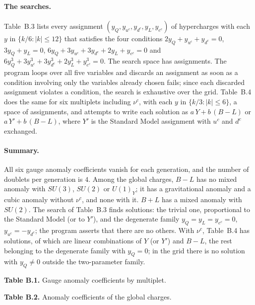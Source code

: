 \paragraph{The searches.} Table~B.3 lists every assignment $(y_Q, y_{u^c}, y_{d^c}, y_L, y_{e^c})$ of hypercharges with each $y$ in $\{k/6 : |k| \leq 12\}$ that satisfies the four conditions $2y_Q + y_{u^c} + y_{d^c} = 0$, $3y_Q + y_L = 0$, $6y_Q + 3y_{u^c} + 3y_{d^c} + 2y_L + y_{e^c} = 0$ and $6y_Q^3 + 3y_{u^c}^3 + 3y_{d^c}^3 + 2y_L^3 + y_{e^c}^3 = 0$. The search space has \vvNBthreeSpace{} assignments. The program loops over all five variables and discards an assignment as soon as a condition involving only the variables already chosen fails; since each discarded assignment violates a condition, the search is exhaustive over the grid. Table~B.4 does the same for six multiplets including $\nu^c$, with each $y$ in $\{k/3 : |k| \leq 6\}$, a space of \vvNBfourSpace{} assignments, and attempts to write each solution as $a\,Y + b\,(B-L)$ or $a\,Y' + b\,(B-L)$, where $Y'$ is the Standard Model assignment with $u^c$ and $d^c$ exchanged.

\paragraph{Summary.} All six gauge anomaly coefficients vanish for each generation, and the number of doublets per generation is $4$. Among the global charges, $B-L$ has no mixed anomaly with $SU(3)$, $SU(2)$ or $U(1)_Y$; it has a gravitational anomaly and a cubic anomaly without $\nu^c$, and none with it. $B+L$ has a mixed anomaly with $SU(2)$. The search of Table~B.3 finds \vvNBthree{} solutions: the trivial one, \vvNBthreeSM{} proportional to the Standard Model (or to $Y'$), and the degenerate family $y_Q = y_L = y_{e^c} = 0$, $y_{u^c} = -y_{d^c}$; the program asserts that there are no others. With $\nu^c$, Table~B.4 has \vvNBfour{} solutions, of which \vvNBfourLin{} are linear combinations of $Y$ (or $Y'$) and $B-L$, the rest belonging to the degenerate family with $y_Q = 0$; in the grid there is no solution with $y_Q \neq 0$ outside the two-parameter family.

\begin{center}\textbf{Table B.1.} Gauge anomaly coefficients by multiplet.\end{center}


\begin{center}\textbf{Table B.2.} Anomaly coefficients of the global charges.\end{center}


